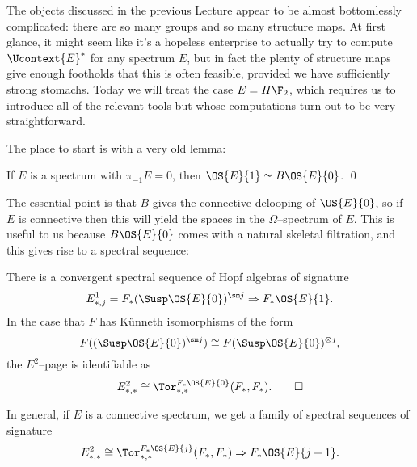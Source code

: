 The objects discussed in the previous Lecture appear to be almost bottomlessly complicated: there are so many groups and so many structure maps.  At first glance, it might seem like it's a hopeless enterprise to actually try to compute $\Ucontext{E}^*$ for any spectrum $E$, but in fact the plenty of structure maps give enough footholds that this is often feasible, provided we have sufficiently strong stomachs.  Today we will treat the case $E = H\F_2$, which requires us to introduce all of the relevant tools but whose computations turn out to be very straightforward.

The place to start is with a very old lemma:
\begin{lemma}
If $E$ is a spectrum with $\pi_{-1} E = 0$, then $\OS{E}{1} \simeq B\OS{E}{0}$. \qed
\end{lemma}
\noindent The essential point is that $B$ gives the connective delooping of $\OS{E}{0}$, so if $E$ is connective then this will yield the spaces in the $\Omega$--spectrum of $E$.  This is useful to us because $B\OS{E}{0}$ comes with a natural skeletal filtration, and this gives rise to a spectral sequence:
\begin{corollary}
There is a convergent spectral sequence of Hopf algebras of signature \[E^1_{*, j} = F_*(\Susp \OS{E}{0})^{\sm j} \Rightarrow F_* \OS{E}{1}.\]   In the case that $F$ has K\"unneth isomorphisms of the form \[F((\Susp \OS{E}{0})^{\sm j}) \cong F(\Susp \OS{E}{0})^{\otimes j},\] the $E^2$--page is identifiable as \[E^2_{*, *} \cong \Tor^{F_* \OS{E}{0}}_{*, *}(F_*, F_*). \qed\]
\end{corollary}
\noindent In general, if $E$ is a connective spectrum, we get a family of spectral sequences of signature \[E^2_{*, *} \cong \Tor^{F_* \OS{E}{j}}_{*, *}(F_*, F_*) \Rightarrow F_* \OS{E}{j+1}.\] 

